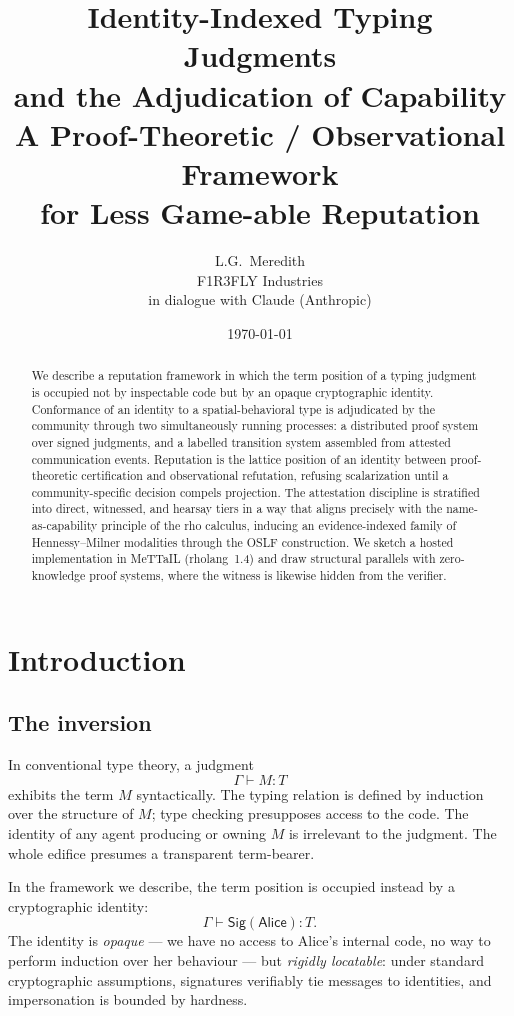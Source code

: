 \documentclass[11pt]{article}
\title{Identity-Indexed Typing Judgments\\
and the Adjudication of Capability\\[0.5em]
\large A Proof-Theoretic / Observational Framework\\for Less Game-able Reputation}
\author{L.G.~Meredith \\ \small F1R3FLY Industries \\[0.25em] \small in dialogue with Claude (Anthropic)}
\date{\today}
\theoremstyle{definition}
\theoremstyle{plain}
\theoremstyle{remark}
\newcommand{\Sig}{\mathsf{Sig}}
\newcommand{\Alice}{\mathsf{Alice}}
\begin{document}
\maketitle

\begin{abstract}
We describe a reputation framework in which the term position of a typing judgment is occupied not by inspectable code but by an opaque cryptographic identity. Conformance of an identity to a spatial-behavioral type is adjudicated by the community through two simultaneously running processes: a distributed proof system over signed judgments, and a labelled transition system assembled from attested communication events. Reputation is the lattice position of an identity between proof-theoretic certification and observational refutation, refusing scalarization until a community-specific decision compels projection. The attestation discipline is stratified into direct, witnessed, and hearsay tiers in a way that aligns precisely with the name-as-capability principle of the rho calculus, inducing an evidence-indexed family of Hennessy--Milner modalities through the OSLF construction. We sketch a hosted implementation in MeTTaIL (rholang~1.4) and draw structural parallels with zero-knowledge proof systems, where the witness is likewise hidden from the verifier.
\end{abstract}

\section{Introduction}

\subsection{The inversion}

In conventional type theory, a judgment
\[
\Gamma \vdash M : T
\]
exhibits the term $M$ syntactically. The typing relation is defined by induction over the structure of $M$; type checking presupposes access to the code. The identity of any agent producing or owning $M$ is irrelevant to the judgment. The whole edifice presumes a transparent term-bearer.

In the framework we describe, the term position is occupied instead by a cryptographic identity:
\[
\Gamma \vdash \Sig(\Alice) : T.
\]
The identity is \emph{opaque} --- we have no access to Alice's internal code, no way to perform induction over her behaviour --- but \emph{rigidly locatable}: under standard cryptographic assumptions, signatures verifiably tie messages to identities, and impersonation is bounded by hardness.
\end{document}
